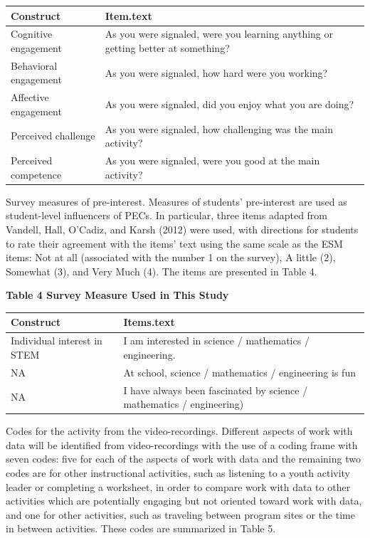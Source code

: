 \documentclass[]{book}
\theoremstyle{definition}
\theoremstyle{definition}
\theoremstyle{definition}
\theoremstyle{remark}
\begin{document}
\begin{tabular}{ll}
\toprule
Construct & Item.text\\
\midrule
Cognitive engagement & As you were signaled, were you learning anything or getting better at something?\\
Behavioral engagement & As you were signaled, how hard were you working?\\
Affective engagement & As you were signaled, did you enjoy what you are doing?\\
Perceived challenge & As you were signaled, how challenging was the main activity?\\
Perceived competence & As you were signaled, were you good at the main activity?\\
\bottomrule
\end{tabular}

Survey measures of pre-interest. Measures of students' pre-interest are
used as student-level influencers of PECs. In particular, three items
adapted from Vandell, Hall, O'Cadiz, and Karsh (2012) were used, with
directions for students to rate their agreement with the items' text
using the same scale as the ESM items: Not at all (associated with the
number 1 on the survey), A little (2), Somewhat (3), and Very Much (4).
The items are presented in Table 4.

\textbf{Table 4 Survey Measure Used in This Study}

\begin{tabular}{ll}
\toprule
Construct & Items.text\\
\midrule
Individual interest in STEM & I am interested in science / mathematics / engineering.\\
NA & At school, science / mathematics / engineering is fun\\
NA & I have always been fascinated by science / mathematics / engineering)\\
\bottomrule
\end{tabular}

Codes for the activity from the video-recordings. Different aspects of
work with data will be identified from video-recordings with the use of
a coding frame with seven codes: five for each of the aspects of work
with data and the remaining two codes are for other instructional
activities, such as listening to a youth activity leader or completing a
worksheet, in order to compare work with data to other activities which
are potentially engaging but not oriented toward work with data, and one
for other activities, such as traveling between program sites or the
time in between activities. These codes are summarized in Table 5.
\end{document}
